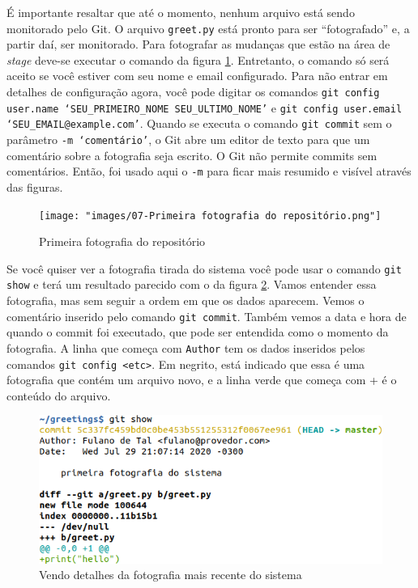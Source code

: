 \documentclass[a4paper]{book}
\begin{document}
É importante resaltar que até o momento, nenhum arquivo está
sendo monitorado pelo Git.
O arquivo \texttt{greet.py} está pronto para ser ``fotografado'' e,
a partir daí, ser monitorado.
Para fotografar as mudanças que estão na área de \textit{stage}
deve-se executar o comando da figura \ref{fig:07}.
Entretanto, o comando só será aceito se você estiver com 
seu nome e email configurado.
Para não entrar em detalhes de configuração agora, 
você pode digitar os comandos 
\texttt{git config user.name `SEU\_PRIMEIRO\_NOME SEU\_ULTIMO\_NOME'} e
\texttt{git config user.email `SEU\_EMAIL@example.com'}.
Quando se executa o comando \texttt{git commit} sem o parâmetro
\texttt{-m `comentário'}, o Git abre um editor de texto para que 
um comentário sobre a fotografia seja escrito.
O Git não permite commits sem comentários.
Então, foi usado aqui o \texttt{-m} para ficar mais resumido e 
visível através das figuras.

\begin{figure}[ht]
\caption{Primeira fotografia do repositório}
\label{fig:07}
\centering
\texttt{[image: "images/07-Primeira fotografia do repositório.png"]}
\end{figure}

Se você quiser ver a fotografia tirada do sistema
você pode usar o comando \texttt{git show} e terá um resultado
parecido com o da figura \ref{fig:08}.
Vamos entender essa fotografia, mas sem seguir a ordem em que 
os dados aparecem.
Vemos o comentário inserido pelo comando \texttt{git commit}.
Também vemos a data e hora de quando o commit foi executado,
que pode ser entendida como o momento da fotografia.
A linha que começa com \texttt{Author} tem os dados inseridos
pelos comandos \texttt{git config <etc>}.
Em negrito, está indicado que essa é uma fotografia que
contém um arquivo novo, e a linha verde que começa com +
é o conteúdo do arquivo.

\begin{figure}[ht]
\caption{Vendo detalhes da fotografia mais recente do sistema}
\label{fig:08}
\centering
\includegraphics[scale=0.6]{"images/08-Vendo detalhes da fotografia mais recente do sistema.png"}
\end{figure}
\end{document}
